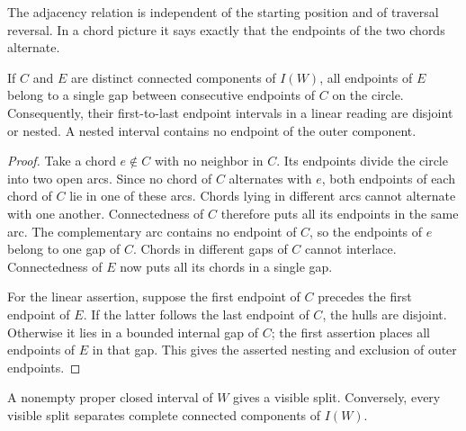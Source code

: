The adjacency relation is independent of the starting position and of
traversal reversal.  In a chord picture it says exactly that the endpoints
of the two chords alternate.

\begin{lemma}
\label{lem:interlace-gaps}
If $C$ and $E$ are distinct connected components of $I(W)$, all endpoints
of $E$ belong to a single gap between consecutive endpoints of $C$ on the
circle.  Consequently, their first-to-last endpoint intervals in a linear
reading are disjoint or nested.  A nested interval contains no endpoint of
the outer component.
\end{lemma}

\begin{proof}
Take a chord $e\notin C$ with no neighbor in $C$.  Its endpoints divide the
circle into two open arcs.  Since no chord of $C$ alternates with $e$, both
endpoints of each chord of $C$ lie in one of these arcs.  Chords lying in
different arcs cannot alternate with one another.  Connectedness of $C$
therefore puts all its endpoints in the same arc.  The complementary arc
contains no endpoint of $C$, so the endpoints of $e$ belong to one gap of $C$.
Chords in different gaps of $C$ cannot interlace.  Connectedness of $E$ now
puts all its chords in a single gap.

For the linear assertion, suppose the first endpoint of $C$ precedes the
first endpoint of $E$.  If the latter follows the last endpoint of $C$,
the hulls are disjoint.  Otherwise it lies in a bounded internal gap of $C$;
the first assertion places all endpoints of $E$ in that gap.  This gives
the asserted nesting and exclusion of outer endpoints.
\end{proof}

\begin{lemma}
\label{lem:closed-visible-cut}
A nonempty proper closed interval of $W$ gives a visible split.  Conversely,
every visible split separates complete connected components of $I(W)$.
\end{lemma}

